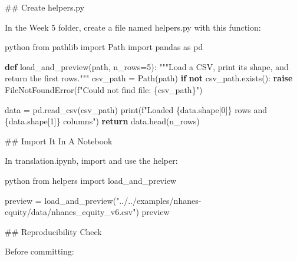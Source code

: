 \documentclass[
  letterpaper,
  DIV=11,
  numbers=noendperiod,
  oneside]{scrreprt}
\newenvironment{Shaded}{\begin{snugshade}}{\end{snugshade}}
\newcommand{\BuiltInTok}[1]{\textcolor[rgb]{0.00,0.23,0.31}{#1}}
\newcommand{\CommentTok}[1]{\textcolor[rgb]{0.37,0.37,0.37}{#1}}
\newcommand{\ControlFlowTok}[1]{\textcolor[rgb]{0.00,0.23,0.31}{\textbf{#1}}}
\newcommand{\DecValTok}[1]{\textcolor[rgb]{0.68,0.00,0.00}{#1}}
\newcommand{\FunctionTok}[1]{\textcolor[rgb]{0.28,0.35,0.67}{#1}}
\newcommand{\ImportTok}[1]{\textcolor[rgb]{0.00,0.46,0.62}{#1}}
\newcommand{\InformationTok}[1]{\textcolor[rgb]{0.37,0.37,0.37}{#1}}
\newcommand{\KeywordTok}[1]{\textcolor[rgb]{0.00,0.23,0.31}{\textbf{#1}}}
\newcommand{\NormalTok}[1]{\textcolor[rgb]{0.00,0.23,0.31}{#1}}
\newcommand{\OperatorTok}[1]{\textcolor[rgb]{0.37,0.37,0.37}{#1}}
\newcommand{\PreprocessorTok}[1]{\textcolor[rgb]{0.68,0.00,0.00}{#1}}
\newcommand{\SpecialCharTok}[1]{\textcolor[rgb]{0.37,0.37,0.37}{#1}}
\newcommand{\SpecialStringTok}[1]{\textcolor[rgb]{0.13,0.47,0.30}{#1}}
\newcommand{\StringTok}[1]{\textcolor[rgb]{0.13,0.47,0.30}{#1}}
\begin{document}
\begin{Shaded}
\begin{Highlighting}[numbers=left,,]
\FunctionTok{\#\# Create \textasciigrave{}helpers.py\textasciigrave{}}

\NormalTok{In the Week 5 folder, create a file named }\InformationTok{\textasciigrave{}helpers.py\textasciigrave{}}\NormalTok{ with this function:}

\InformationTok{\textasciigrave{}\textasciigrave{}\textasciigrave{}python}
\ImportTok{from}\NormalTok{ pathlib }\ImportTok{import}\NormalTok{ Path}
\ImportTok{import}\NormalTok{ pandas }\ImportTok{as}\NormalTok{ pd}


\KeywordTok{def}\NormalTok{ load\_and\_preview(path, n\_rows}\OperatorTok{=}\DecValTok{5}\NormalTok{):}
    \CommentTok{"""Load a CSV, print its shape, and return the first rows."""}
\NormalTok{    csv\_path }\OperatorTok{=}\NormalTok{ Path(path)}
    \ControlFlowTok{if} \KeywordTok{not}\NormalTok{ csv\_path.exists():}
        \ControlFlowTok{raise} \PreprocessorTok{FileNotFoundError}\NormalTok{(}\SpecialStringTok{f"Could not find file: }\SpecialCharTok{\{}\NormalTok{csv\_path}\SpecialCharTok{\}}\SpecialStringTok{"}\NormalTok{)}

\NormalTok{    data }\OperatorTok{=}\NormalTok{ pd.read\_csv(csv\_path)}
    \BuiltInTok{print}\NormalTok{(}\SpecialStringTok{f"Loaded }\SpecialCharTok{\{}\NormalTok{data}\SpecialCharTok{.}\NormalTok{shape[}\DecValTok{0}\NormalTok{]}\SpecialCharTok{\}}\SpecialStringTok{ rows and }\SpecialCharTok{\{}\NormalTok{data}\SpecialCharTok{.}\NormalTok{shape[}\DecValTok{1}\NormalTok{]}\SpecialCharTok{\}}\SpecialStringTok{ columns"}\NormalTok{)}
    \ControlFlowTok{return}\NormalTok{ data.head(n\_rows)}
\InformationTok{\textasciigrave{}\textasciigrave{}\textasciigrave{}}

\FunctionTok{\#\# Import It In A Notebook}

\NormalTok{In }\InformationTok{\textasciigrave{}translation.ipynb\textasciigrave{}}\NormalTok{, import and use the helper:}

\InformationTok{\textasciigrave{}\textasciigrave{}\textasciigrave{}python}
\ImportTok{from}\NormalTok{ helpers }\ImportTok{import}\NormalTok{ load\_and\_preview}

\NormalTok{preview }\OperatorTok{=}\NormalTok{ load\_and\_preview(}\StringTok{"../../examples/nhanes{-}equity/data/nhanes\_equity\_v6.csv"}\NormalTok{)}
\NormalTok{preview}
\InformationTok{\textasciigrave{}\textasciigrave{}\textasciigrave{}}

\FunctionTok{\#\# Reproducibility Check}

\NormalTok{Before committing:}


\end{Highlighting}
\end{Shaded}
\end{document}
